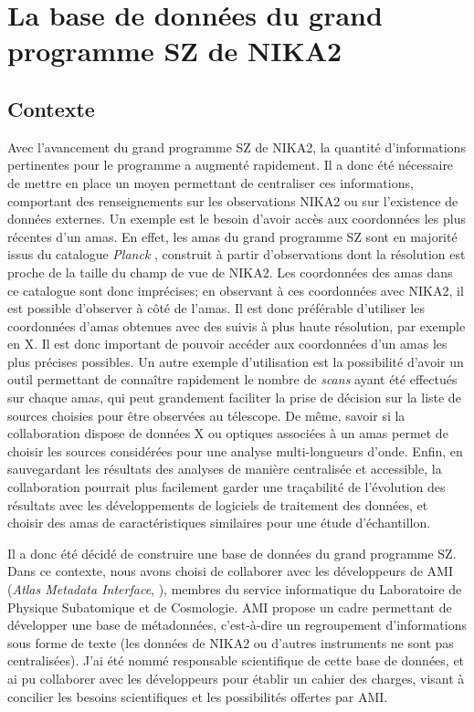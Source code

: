 \section{La base de données du grand programme SZ de NIKA2}
\label{sec:nk_ami}

\subsection{Contexte}

Avec l'avancement du grand programme SZ de NIKA2, la quantité d'informations pertinentes pour le programme a augmenté rapidement.
Il a donc été nécessaire de mettre en place un moyen permettant de centraliser ces informations, comportant des renseignements sur les observations NIKA2 ou sur l'existence de données externes.
Un exemple est le besoin d'avoir accès aux coordonnées les plus récentes d'un amas.
En effet, les amas du grand programme SZ sont en majorité issus du catalogue \textit{Planck} \cite{planck_collaboration_planck_2016-3}, construit à partir d'observations dont la résolution est proche de la taille du champ de vue de NIKA2.
Les coordonnées des amas dans ce catalogue sont donc imprécises; en observant à ces coordonnées avec NIKA2, il est possible d'observer à côté de l'amas.
Il est donc préférable d'utiliser les coordonnées d'amas obtenues avec des suivis à plus haute résolution, par exemple en X.
Il est donc important de pouvoir accéder aux coordonnées d'un amas les plus précises possibles.
Un autre exemple d'utilisation est la possibilité d'avoir un outil permettant de connaître rapidement le nombre de \textit{scans} ayant été effectués sur chaque amas, qui peut grandement faciliter la prise de décision sur la liste de sources choisies pour être observées au télescope.
De même, savoir si la collaboration dispose de données X ou optiques associées à un amas permet de choisir les sources considérées pour une analyse multi-longueurs d'onde.
Enfin, en sauvegardant les résultats des analyses de manière centralisée et accessible, la collaboration pourrait plus facilement garder une traçabilité de l'évolution des résultats avec les développements de logiciels de traitement des données, et choisir des amas de caractéristiques similaires pour une étude d'échantillon.

Il a donc été décidé de construire une base de données du grand programme SZ.
Dans ce contexte, nous avons choisi de collaborer avec les développeurs de AMI (\textit{Atlas Metadata Interface}, \cite{albrand_atlas_2010}), membres du service informatique du Laboratoire de Physique Subatomique et de Cosmologie.
AMI propose un cadre permettant de développer une base de métadonnées, c'est-à-dire un regroupement d'informations sous forme de texte (les données de NIKA2 ou d'autres instruments ne sont pas centralisées).
J'ai été nommé responsable scientifique de cette base de données, et ai pu collaborer avec les développeurs pour établir un cahier des charges, visant à concilier les besoins scientifiques et les possibilités offertes par AMI.

